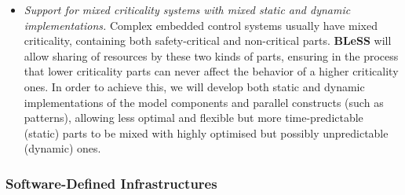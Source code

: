 \documentclass[a4paper,11pt]{article}
\newcommand{\project}[1]{\textbf{#1}\xspace}
\newcommand{\BLESS}{\project{BLeSS}}
\newcommand{\TheProject}{\BLESS}
\begin{document}
\begin{itemize}
\item \textit{Support for mixed criticality systems with mixed
static and dynamic implementations.} Complex embedded
  control systems usually have mixed criticality, containing both 
  safety-critical and non-critical parts. \TheProject will 
  allow sharing of resources by these two kinds of parts,
  ensuring in the process that lower criticality parts can 
  never affect the behavior of a higher criticality ones.
  In order to achieve this, we will develop both static and dynamic
  implementations of the model components and parallel constructs
  (such as patterns), allowing less optimal and flexible but more
  time-predictable (static) parts to be mixed with highly optimised
  but possibly unpredictable (dynamic) ones.
  

\end{itemize}


\subsubsection{Software-Defined Infrastructures}
\label{sect:SDIs}
\end{document}
